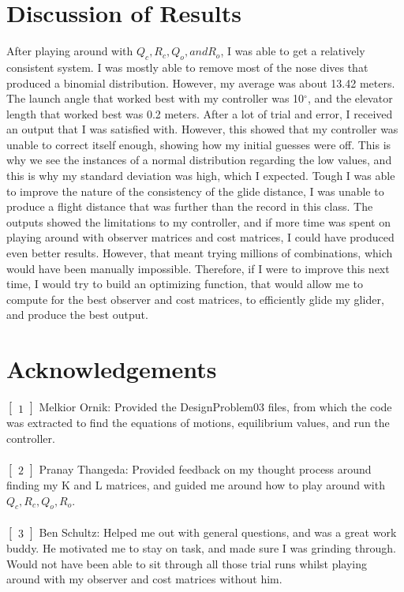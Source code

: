 \documentclass[12pt]{article}
\begin{document}
\section{Discussion of Results}
After playing around with $Q_{c},R_{c},Q_{o}, and R_{o}$, I was able to get a relatively consistent system. I was mostly able to remove most of the nose dives that produced a binomial distribution. However, my average was about 13.42 meters. The launch angle that worked best with my controller was 10$^{\circ}$, and the elevator length that worked best was 0.2 meters. After a lot of trial and error, I received an output that I was satisfied with. However, this showed that my controller was unable to correct itself enough, showing how my initial guesses were off. This is why we see the instances of a normal distribution regarding the low values, and this is why my standard deviation was high, which I expected. Tough I was able to improve the nature of the consistency of the glide distance, I was unable to produce a flight distance that was further than the record in this class. The outputs showed the limitations to my controller, and if more time was spent on playing around with observer matrices and cost matrices, I could have produced even better results. However, that meant trying millions of combinations, which would have been manually impossible. Therefore, if I were to improve this next time, I would try to build an optimizing function, that would allow me to compute for the best observer and cost matrices, to efficiently glide my glider, and produce the best output.

\section{Acknowledgements}

$\begin{bmatrix}
1
\end{bmatrix}$ Melkior Ornik: Provided the DesignProblem03 files, from which the code was extracted to find the equations of motions, equilibrium values, and run the controller. \\
\\
$\begin{bmatrix}
2
\end{bmatrix}$ Pranay Thangeda: Provided feedback on my thought process around finding my K and L matrices, and guided me around how to play around with 
$Q_{c},R_{c},Q_{o},R_{o}$. \\
\\
$\begin{bmatrix}
3
\end{bmatrix}$ Ben Schultz: Helped me out with general questions, and was a great work buddy. He motivated me to stay on task, and made sure I was grinding through. Would not have been able to sit through all those trial runs whilst playing around with my observer and cost matrices without him.
\end{document}
